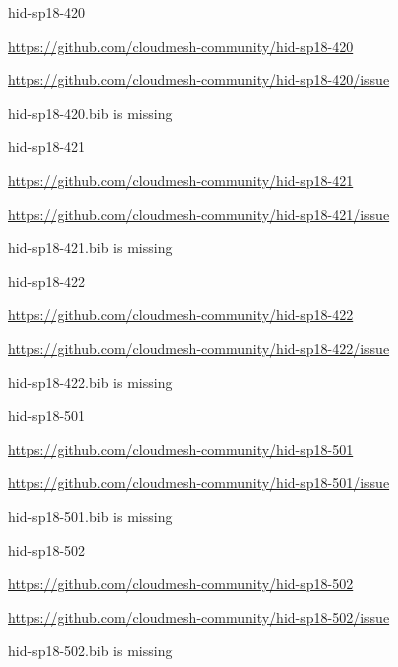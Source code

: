 \begin{IU}

hid-sp18-420

\url{https://github.com/cloudmesh-community/hid-sp18-420}

\url{https://github.com/cloudmesh-community/hid-sp18-420/issue}

hid-sp18-420.bib is missing

\end{IU}


\begin{IU}

hid-sp18-421

\url{https://github.com/cloudmesh-community/hid-sp18-421}

\url{https://github.com/cloudmesh-community/hid-sp18-421/issue}

hid-sp18-421.bib is missing

\end{IU}


\begin{IU}

hid-sp18-422

\url{https://github.com/cloudmesh-community/hid-sp18-422}

\url{https://github.com/cloudmesh-community/hid-sp18-422/issue}

hid-sp18-422.bib is missing

\end{IU}


\begin{IU}

hid-sp18-501

\url{https://github.com/cloudmesh-community/hid-sp18-501}

\url{https://github.com/cloudmesh-community/hid-sp18-501/issue}

hid-sp18-501.bib is missing

\end{IU}


\begin{IU}

hid-sp18-502

\url{https://github.com/cloudmesh-community/hid-sp18-502}

\url{https://github.com/cloudmesh-community/hid-sp18-502/issue}

hid-sp18-502.bib is missing

\end{IU}



